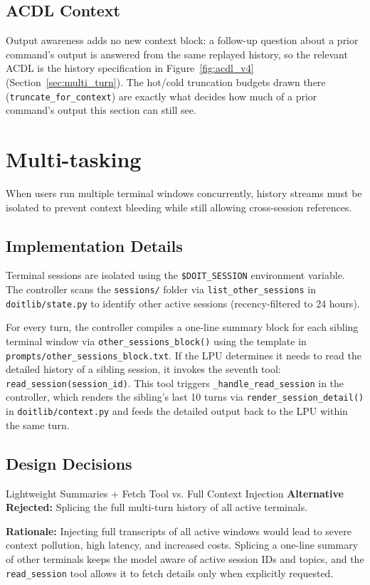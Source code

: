 \documentclass[11pt,a4paper]{article}
\begin{document}
\subsection{ACDL Context}
Output awareness adds no new context block: a follow-up question about a prior command's output is answered from the same replayed history, so the relevant ACDL is the history specification in Figure~\ref{fig:acdl_v4} (Section~\ref{sec:multi_turn}). The hot/cold truncation budgets drawn there (\texttt{truncate\_for\_context}) are exactly what decides how much of a prior command's output this section can still see.

\section{Multi-tasking}
\label{sec:multi_tasking}
When users run multiple terminal windows concurrently, history streams must be isolated to prevent context bleeding while still allowing cross-session references.

\subsection{Implementation Details}
Terminal sessions are isolated using the \texttt{\$DOIT\_SESSION} environment variable. The controller scans the \texttt{sessions/} folder via \texttt{list\_other\_sessions} in \texttt{doitlib/state.py} to identify other active sessions (recency-filtered to 24 hours).

For every turn, the controller compiles a one-line summary block for each sibling terminal window via \texttt{other\_sessions\_block()} using the template in \texttt{prompts/other\_sessions\_block.txt}. If the LPU determines it needs to read the detailed history of a sibling session, it invokes the seventh tool: \texttt{read\_session(session\_id)}. This tool triggers \texttt{\_handle\_read\_session} in the controller, which renders the sibling's last 10 turns via \texttt{render\_session\_detail()} in \texttt{doitlib/context.py} and feeds the detailed output back to the LPU within the same turn.

\subsection{Design Decisions}

\begin{decisionbox}{Lightweight Summaries + Fetch Tool vs. Full Context Injection}
    \textbf{Alternative Rejected:} Splicing the full multi-turn history of all active terminals.
    
    \textbf{Rationale:} Injecting full transcripts of all active windows would lead to severe context pollution, high latency, and increased costs. Splicing a one-line summary of other terminals keeps the model aware of active session IDs and topics, and the \texttt{read\_session} tool allows it to fetch details only when explicitly requested.
\end{decisionbox}
\end{document}
